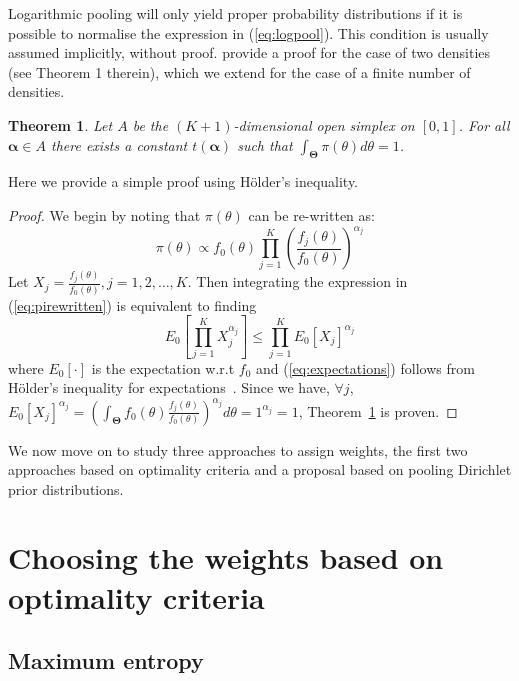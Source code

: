 \documentclass[a4paper, notitlepage, 10pt]{article}
\newtheorem{theo}{Theorem}[]
\begin{document}
Logarithmic pooling will only yield proper probability distributions if it is possible to normalise the expression in (\ref{eq:logpool}).
This condition is usually assumed implicitly, without proof.
\citet{poole2000} provide a proof for the case of two densities (see Theorem 1 therein), which we extend for the case of a finite number of densities.
\begin{theo}
\label{thm:normalisation}
Let $A$ be the $(K+1)$-dimensional open simplex on $[0,1]$.
For all $\boldsymbol\alpha \in A$ there exists a constant $t(\boldsymbol\alpha)$ such that $\int_{\boldsymbol\Theta}\pi(\theta)d\theta = 1$.
\end{theo}

Here we provide a simple proof using H\"{o}lder's inequality.
\begin{proof}
We begin by noting that $\pi(\theta)$ can be re-written as:
\begin{equation}
\label{eq:pirewritten}
 \pi(\theta) \propto f_0(\theta)\prod_{j=1}^{K} \left(\frac{f_j(\theta)}{f_0(\theta)}\right)^{\alpha_j}
\end{equation}
Let $X_j = \frac{f_j(\theta)}{f_0(\theta)}, j=1, 2,\ldots, K$. 
Then integrating the expression in (\ref{eq:pirewritten}) is equivalent to finding 
\begin{equation}
\label{eq:expectations}
E_{0}\left[\prod_{j=1}^KX_j^{\alpha_j}\right] \leq \prod_{j=1}^KE_{0}[X_j]^{\alpha_j}
\end{equation}
where $E_{0}[\cdot]$ is the expectation w.r.t $f_0$ and (\ref{eq:expectations}) follows from H\"{o}lder's inequality for expectations~\citep{yeh2011}.
Since we have, $\forall j$, $ E_{0}[X_j]^{\alpha_j} = \left(\int_{\boldsymbol\Theta}f_0(\theta)\frac{f_j(\theta)}{f_0(\theta)}\right)^{\alpha_j}d\theta=1^{\alpha_j}=1$, Theorem~\ref{thm:normalisation} is proven.
\end{proof}

We now move on to study three approaches to assign weights, the first two approaches based on optimality criteria and a proposal based on pooling Dirichlet prior distributions.

\section*{Choosing the weights based on optimality criteria}
\subsection*{Maximum entropy}
\end{document}
